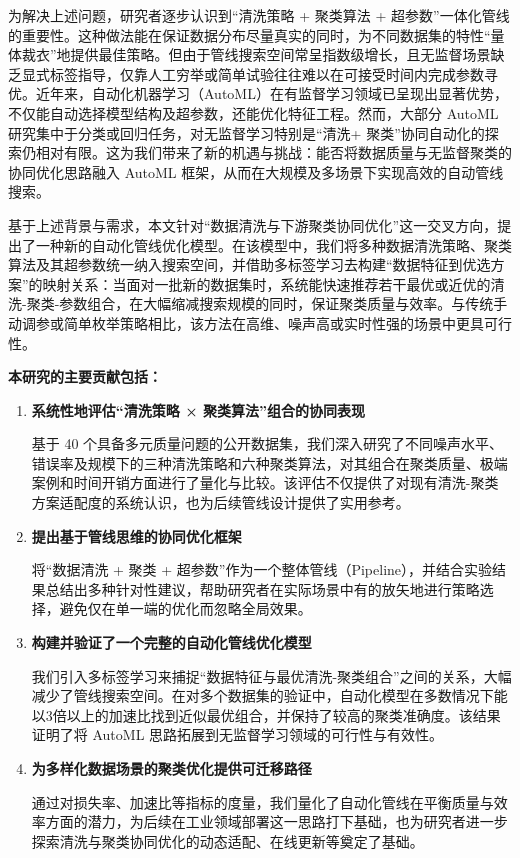 \documentclass[10pt]{article} %
\numberwithin{equation}{section}
\begin{document}
为解决上述问题，研究者逐步认识到“清洗策略 + 聚类算法 + 超参数”一体化管线的重要性\cite{Blumenberg2020}。这种做法能在保证数据分布尽量真实的同时，为不同数据集的特性“量体裁衣”地提供最佳策略。但由于管线搜索空间常呈指数级增长，且无监督场景缺乏显式标签指导，仅靠人工穷举或简单试验往往难以在可接受时间内完成参数寻优。近年来，自动化机器学习（AutoML）在有监督学习领域已呈现出显著优势\cite{Barbudo2023}，不仅能自动选择模型结构及超参数，还能优化特征工程\cite{SALEHIN202452, HE2021106622}。然而，大部分 AutoML 研究集中于分类或回归任务\cite{9458702}，对无监督学习特别是“清洗+ 聚类”协同自动化的探索仍相对有限\cite{10.1145/3643564}。这为我们带来了新的机遇与挑战：能否将数据质量与无监督聚类的协同优化思路融入 AutoML 框架，从而在大规模及多场景下实现高效的自动管线搜索。

基于上述背景与需求，本文针对“数据清洗与下游聚类协同优化”这一交叉方向，提出了一种新的自动化管线优化模型。在该模型中，我们将多种数据清洗策略、聚类算法及其超参数统一纳入搜索空间，并借助多标签学习去构建“数据特征到优选方案”的映射关系：当面对一批新的数据集时，系统能快速推荐若干最优或近优的清洗-聚类-参数组合，在大幅缩减搜索规模的同时，保证聚类质量与效率。与传统手动调参或简单枚举策略相比，该方法在高维、噪声高或实时性强的场景中更具可行性。

\textbf{本研究的主要贡献包括：}
\begin{enumerate}
    \item \textbf{系统性地评估“清洗策略 × 聚类算法”组合的协同表现}

    基于 40 个具备多元质量问题的公开数据集，我们深入研究了不同噪声水平、错误率及规模下的三种清洗策略和六种聚类算法，对其组合在聚类质量、极端案例和时间开销方面进行了量化与比较。该评估不仅提供了对现有清洗-聚类方案适配度的系统认识，也为后续管线设计提供了实用参考。
    \item \textbf{提出基于管线思维的协同优化框架}

    将“数据清洗 + 聚类 + 超参数”作为一个整体管线（Pipeline），并结合实验结果总结出多种针对性建议，帮助研究者在实际场景中有的放矢地进行策略选择，避免仅在单一端的优化而忽略全局效果。
    \item \textbf{构建并验证了一个完整的自动化管线优化模型}

    我们引入多标签学习来捕捉“数据特征与最优清洗-聚类组合”之间的关系，大幅减少了管线搜索空间。在对多个数据集的验证中，自动化模型在多数情况下能以3倍以上的加速比找到近似最优组合，并保持了较高的聚类准确度。该结果证明了将 AutoML 思路拓展到无监督学习领域的可行性与有效性。
    \item \textbf{为多样化数据场景的聚类优化提供可迁移路径}

    通过对损失率、加速比等指标的度量，我们量化了自动化管线在平衡质量与效率方面的潜力，为后续在工业领域部署这一思路打下基础，也为研究者进一步探索清洗与聚类协同优化的动态适配、在线更新等奠定了基础。

\end{enumerate}
\end{document}
